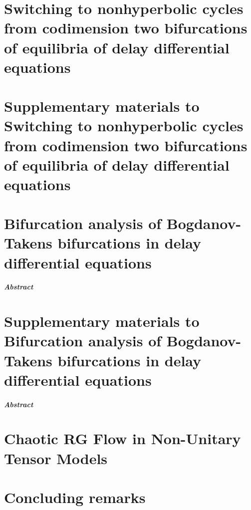 \documentclass[twoside]{report}
\begin{document}
\chapter[Switching to nonhyperbolic cycles in DDEs]
        {Switching to nonhyperbolic cycles from codimension two bifurcations of equilibria of delay differential equations}
\label{chapter:switching}


\chapter[Supplementary materials]
        {Supplementary materials to 
         Switching to nonhyperbolic cycles from codimension two bifurcations of equilibria of delay differential equations}
\label{chapter:switching_supplement}
\renewcommand\datadir{data/switching}


\siamfalse
{} 
\renewcommand\tikzdir{./tikz/btpaper}
\renewcommand\imagedir{./images/btpaper/}
\renewcommand\datadir{./data/btpaper}
\chapter[Bifurcation analysis of BT points in DDEs]
        {Bifurcation analysis of Bogdanov-Takens bifurcations in delay differential equations}
\label{chapter:BT_DDE}
\paragraph{{\color{header1}Abstract}}


\chapter[Supplementary materials]
        {Supplementary materials to Bifurcation analysis of Bogdanov-Takens bifurcations in delay differential equations}
\label{chapter:BT_DDE_supplement}
\paragraph{{\color{header1}Abstract}}


\renewcommand\tikzdir{./tikz/chaoticRGflow}
\renewcommand\imagedir{./images/chaoticRGflow/}
\renewcommand\datadir{./data/chaoticRGflow}
\chapter{Chaotic RG Flow in Non-Unitary Tensor Models}
\label{chapter:chaoticRGFlow}


\chapter{Concluding remarks}




\end{document}

